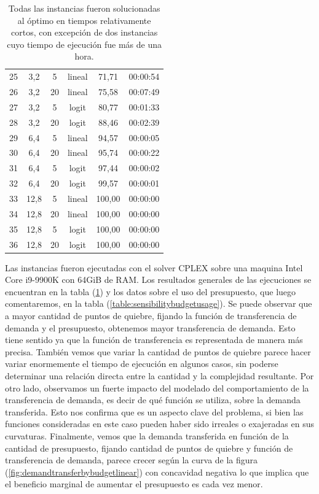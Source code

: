 \documentclass{article}
\begin{document}
\begin{table}
\begin{tabular}{cccccc}
        25 & 3,2 & 5 & lineal & 71,71 & 00:00:54 \\
        26 & 3,2 & 20 & lineal & 75,58 & 00:07:49 \\
        27 & 3,2 & 5 & logit & 80,77 & 00:01:33 \\
        28 & 3,2 & 20 & logit & 88,46 & 00:02:39 \\
        29 & 6,4 & 5 & lineal & 94,57 & 00:00:05 \\
        30 & 6,4 & 20 & lineal & 95,74 & 00:00:22 \\
        31 & 6,4 & 5 & logit & 97,44 & 00:00:02 \\
        32 & 6,4 & 20 & logit & 99,57 & 00:00:01 \\
        33 & 12,8 & 5 & lineal & 100,00 & 00:00:00 \\
        34 & 12,8 & 20 & lineal & 100,00 & 00:00:00 \\
        35 & 12,8 & 5 & logit & 100,00 & 00:00:00 \\
        36 & 12,8 & 20 & logit & 100,00 & 00:00:00 \\
        \bottomrule
    \end{tabular}
      \caption{Todas las instancias fueron solucionadas al óptimo en tiempos relativamente cortos, con excepción de dos instancias cuyo tiempo de ejecución fue más de una hora.} \label{table:sensibilityresults}
  \end{table}

  Las instancias fueron ejecutadas con el solver CPLEX sobre una maquina Intel Core i9-9900K con 64GiB de RAM. Los resultados generales de las ejecuciones se encuentran en la tabla (\ref{table:sensibilityresults}) y los datos sobre el uso del presupuesto, que luego comentaremos, en la tabla (\ref{table:sensibilitybudgetusage}). Se puede observar que a mayor cantidad de puntos de quiebre, fijando la función de transferencia de demanda y el presupuesto, obtenemos mayor transferencia de demanda. Esto tiene sentido ya que la función de transferencia es representada de manera más precisa. También vemos que variar la cantidad de puntos de quiebre parece hacer variar enormemente el tiempo de ejecución en algunos casos, sin poderse determinar una relación directa entre la cantidad y la complejidad resultante. Por otro lado, observamos un fuerte impacto del modelado del comportamiento de la transferencia de demanda, es decir de qué función se utiliza, sobre la demanda transferida. Esto nos confirma que es un aspecto clave del problema, si bien las funciones consideradas en este caso pueden haber sido irreales o exajeradas en sus curvaturas. Finalmente, vemos que la demanda transferida en función de la cantidad de presupuesto, fijando cantidad de puntos de quiebre y función de transferencia de demanda, parece crecer según la curva de la figura (\ref{fig:demandtransferbybudgetlinear}) con concavidad negativa lo que implica que el beneficio marginal de aumentar el presupuesto es cada vez menor.
\end{document}
